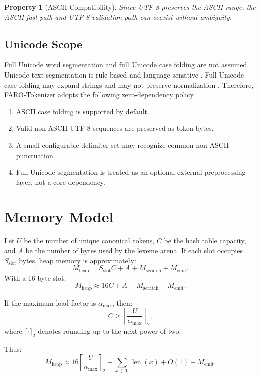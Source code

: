 \documentclass[11pt,a4paper]{article}
\newtheorem{property}{Property}
\newcommand{\Tokens}{\mathcal{X}}
\newcommand{\toklen}{\operatorname{len}}
\begin{document}
\begin{property}[ASCII Compatibility]
Since UTF-8 preserves the ASCII range, the ASCII fast path and UTF-8 validation path can coexist without ambiguity.
\end{property}

\subsection{Unicode Scope}

Full Unicode word segmentation and full Unicode case folding are not assumed. Unicode text segmentation is rule-based and language-sensitive \cite{UnicodeUAX29}. Full Unicode case folding may expand strings and may not preserve normalization \cite{UnicodeCaseFolding}. Therefore, FARO-Tokenizer adopts the following zero-dependency policy.

\begin{enumerate}[label=(\arabic*)]
\item ASCII case folding is supported by default.
\item Valid non-ASCII UTF-8 sequences are preserved as token bytes.
\item A small configurable delimiter set may recognize common non-ASCII punctuation.
\item Full Unicode segmentation is treated as an optional external preprocessing layer, not a core dependency.
\end{enumerate}

\section{Memory Model}

Let \(U\) be the number of unique canonical tokens, \(C\) be the hash table capacity, and \(A\) be the number of bytes used by the lexeme arena. If each slot occupies \(S_{\text{slot}}\) bytes, heap memory is approximately:
\[
M_{\text{heap}}=S_{\text{slot}}C+A+M_{\text{scratch}}+M_{\text{emit}}.
\]
With a 16-byte slot:
\[
M_{\text{heap}}\approx 16C+A+M_{\text{scratch}}+M_{\text{emit}}.
\]

If the maximum load factor is \(\alpha_{\max}\), then:
\[
C \ge \left\lceil \frac{U}{\alpha_{\max}}\right\rceil_2,
\]
where \(\lceil\cdot\rceil_2\) denotes rounding up to the next power of two.

Thus:
\[
M_{\text{heap}}\approx
16\left\lceil \frac{U}{\alpha_{\max}}\right\rceil_2
+
\sum_{x\in\Tokens}\toklen(x)
+
O(1)
+
M_{\text{emit}}.
\]
\end{document}
